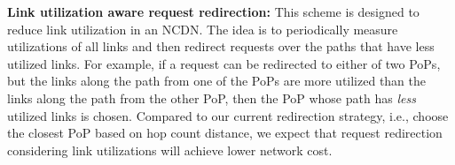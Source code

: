 \textbf{Link utilization aware request redirection:}
\label{fig:linkloadredir}
This scheme is designed to reduce link utilization in an NCDN. The idea is to periodically measure  utilizations of all links and then  redirect requests over the paths that have less utilized links. For example, if a request can be redirected to either of two PoPs, but the links along the path from one of the PoPs are more utilized than the links along the path from the other PoP, then the PoP whose path has \emph{less} utilized links is chosen. Compared to our current redirection strategy, i.e., choose the closest PoP based on hop count distance,  we expect that request redirection considering link utilizations will achieve lower network cost.














